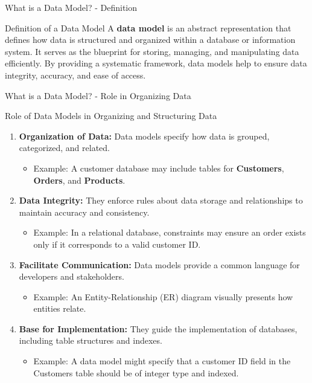 \documentclass[aspectratio=169]{beamer}
\begin{document}
\begin{frame}[fragile]{What is a Data Model? - Definition}
    \begin{block}{Definition of a Data Model}
        A \textbf{data model} is an abstract representation that defines how data is structured and organized within a database or information system. It serves as the blueprint for storing, managing, and manipulating data efficiently. By providing a systematic framework, data models help to ensure data integrity, accuracy, and ease of access.
    \end{block}
\end{frame}

\begin{frame}[fragile]{What is a Data Model? - Role in Organizing Data}
    \begin{block}{Role of Data Models in Organizing and Structuring Data}
        \begin{enumerate}
            \item \textbf{Organization of Data:} Data models specify how data is grouped, categorized, and related. 
            \begin{itemize}
                \item Example: A customer database may include tables for \textbf{Customers}, \textbf{Orders}, and \textbf{Products}.
            \end{itemize}
            
            \item \textbf{Data Integrity:} They enforce rules about data storage and relationships to maintain accuracy and consistency.
            \begin{itemize}
                \item Example: In a relational database, constraints may ensure an order exists only if it corresponds to a valid customer ID.
            \end{itemize}
            
            \item \textbf{Facilitate Communication:} Data models provide a common language for developers and stakeholders.
            \begin{itemize}
                \item Example: An Entity-Relationship (ER) diagram visually presents how entities relate.
            \end{itemize}
            
            \item \textbf{Base for Implementation:} They guide the implementation of databases, including table structures and indexes.
            \begin{itemize}
                \item Example: A data model might specify that a customer ID field in the Customers table should be of integer type and indexed.
            \end{itemize}
        \end{enumerate}
    \end{block}
\end{frame}
\end{document}
